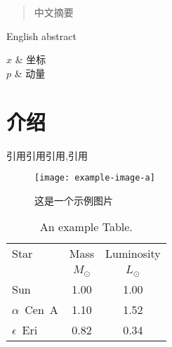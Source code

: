 \documentclass{YNUthesis}
\begin{document}
\raggedbottom

\frontmatter

\begin{abstract}
	中文摘要
\end{abstract}

\begin{abstract*}
	English abstract
\end{abstract*}

\tableofcontents
\listoffigures
\listoftables

\begin{notation}[ll]
	$x$                  & 坐标        \\
	$p$                  & 动量        \\
\end{notation}

\mainmatter

%   
%   
%   

\chapter{介绍}

\zhlipsum
引用\cite{BQC_2020}引用\cite{向守平2008天体物理概论}引用\cite{2019First},引用\cite{BQC_2020,向守平2008天体物理概论,2019First}

\begin{figure}[htbp]
	\centering
	\texttt{[image: example-image-a]}%
	\caption{这是一个示例图片}
	\label{fig:一个示例图片}
\end{figure}

\zhlipsum

\begin{table}[htbp]
	\centering
	\caption{An example Table.}
	\label{tab:example-tab}
	\begin{tabular}{lcc}
		\toprule
		Star           & Mass        & Luminosity  \\
		               & $M_{\odot}$ & $L_{\odot}$ \\
		\midrule
		Sun            & 1.00        & 1.00        \\
		$\alpha$~Cen~A & 1.10        & 1.52        \\
		$\epsilon$~Eri & 0.82        & 0.34        \\
		\bottomrule
	\end{tabular}
\end{table}
\end{document}
